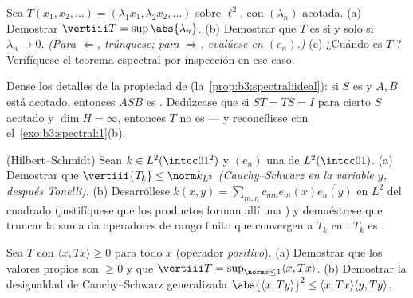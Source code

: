 \begin{exercise}[$\star$]\label{exo:b3:spectral:2}
Sea $T(x_1, x_2, \dots) = (\lambda_1x_1, \lambda_2x_2, \dots)$ sobre
$\ell^2$, con $(\lambda_n)$ acotada. (a) Demostrar
$\vertiii T = \sup\abs{\lambda_n}$. (b) Demostrar que $T$ es
 si y solo si
$\lambda_n \to 0$. \emph{(Para $\Leftarrow$, trúnquese; para
$\Rightarrow$, evalúese en
$(e_n)$.)}
(c) ¿Cuándo es $T$ ?
Verifíquese el teorema espectral por inspección en ese caso.
\end{exercise}

\begin{exercise}[$\star\star$]\label{exo:b3:spectral:3}
Dense los detalles de la propiedad de 
(la~\cref{prop:b3:spectral:ideal}): si $S$ es
 y $A, B$ está acotado,
entonces $ASB$ es . Dedúzcase
que si $ST = TS = I$ para cierto $S$ acotado y $\dim H = \infty$,
entonces $T$ no es  --- y
reconcíliese con el~\cref{exo:b3:spectral:1}(b).
\end{exercise}

\begin{exercise}[$\star\star$]\label{exo:b3:spectral:4}
(Hilbert--Schmidt) Sean $k \in L^2(\intcc01^2)$ y $(e_n)$ una
 de $L^2(\intcc01)$. (a)
Demostrar que $\vertiii{T_k} \leq \norm k_{L^2}$ \emph{(Cauchy--Schwarz
en la variable $y$, después Tonelli)}. (b) Desarróllese
$k(x,y) = \sum_{m,n}c_{mn}e_m(x)\overline{e_n(y)}$ en $L^2$ del cuadrado
(justifíquese que los productos forman allí una
) y demuéstrese que truncar
la suma da operadores de rango finito que convergen a $T_k$ en
: $T_k$ es
.
\end{exercise}

\begin{exercise}[$\star\star$]\label{exo:b3:spectral:5}
Sea $T$  con
$\langle x, Tx\rangle \geq 0$ para todo $x$ (operador \emph{positivo}).
(a) Demostrar que los valores propios son $\geq 0$ y que $\vertiii T =
\sup_{\norm x\leq1}\langle x, Tx\rangle$. (b) Demostrar la desigualdad
de Cauchy--Schwarz generalizada
$\abs{\langle x, Ty\rangle}^2 \leq \langle x, Tx\rangle\langle
y, Ty\rangle$.
\end{exercise}

